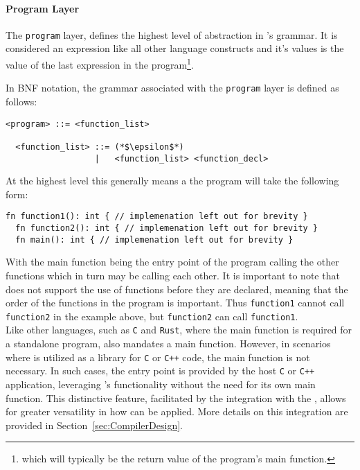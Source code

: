 \paragraph{Program Layer}\hfill 
\vspace{.3em} \hfill

The \texttt{program} layer, defines the highest level of abstraction in \lang's grammar. 
It is considered an expression like all other language constructs and it's values is
the value of the last expression in the program\footnote{which will typically be the
return value of the program's main function.}. \\

\newpage

In BNF notation, the grammar associated with the \texttt{program} layer is defined as follows:


\begin{lstlisting}[caption={Program Layer}, label={lst:ProgramLayer},
frame={single}]
  <program> ::= <function_list>

  <function_list> ::= (*$\epsilon$*)
                  |   <function_list> <function_decl> 
\end{lstlisting}

At the highest level this generally means a the program will take the following form: 

\begin{lstlisting}[caption={Program layout}, label={lst:ProgramLayout}, frame={single}]
  fn function1(): int { // implemenation left out for brevity }
  fn function2(): int { // implemenation left out for brevity }
  fn main(): int { // implemenation left out for brevity }
\end{lstlisting}

With the main function being the entry point of the program calling the other
functions which in turn may be calling each other. It is important to note that
\lang{} does not support the use of functions before they are declared, meaning that
the order of the functions in the program is important. Thus \texttt{function1}
cannot call \texttt{function2} in the example above, but \texttt{function2} can call
\texttt{function1}. \\

Like other languages, such as \texttt{C} and \texttt{Rust}, where the main function is required for a
standalone program, \lang{} also mandates a main function. However, in scenarios
where \lang{} is utilized as a library for \texttt{C} or \texttt{C++} code, the main function is not
necessary. In such cases, the entry point is provided by the host \texttt{C} or
\texttt{C++} application, leveraging \lang{}'s functionality without the need for its own main
function. This distinctive feature, facilitated by the integration with the \gcc{},
allows for greater versatility in how \lang{} can be applied. More
details on this integration are provided in Section~\ref{sec:CompilerDesign}.

